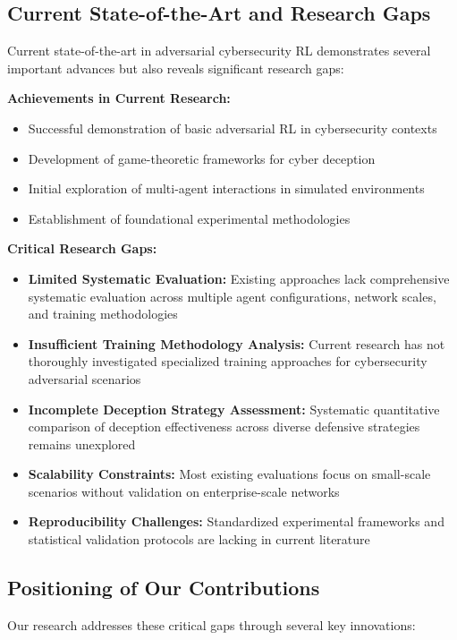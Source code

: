 \documentclass[12pt,oneside,a4paper]{article}
\theoremstyle{definition}
\theoremstyle{plain}
\begin{document}
\subsection{Current State-of-the-Art and Research Gaps}

Current state-of-the-art in adversarial cybersecurity RL demonstrates several important advances but also reveals significant research gaps:

\textbf{Achievements in Current Research:}
\begin{itemize}
\item Successful demonstration of basic adversarial RL in cybersecurity contexts
\item Development of game-theoretic frameworks for cyber deception
\item Initial exploration of multi-agent interactions in simulated environments
\item Establishment of foundational experimental methodologies
\end{itemize}

\textbf{Critical Research Gaps:}
\begin{itemize}
\item \textbf{Limited Systematic Evaluation:} Existing approaches lack comprehensive systematic evaluation across multiple agent configurations, network scales, and training methodologies
\item \textbf{Insufficient Training Methodology Analysis:} Current research has not thoroughly investigated specialized training approaches for cybersecurity adversarial scenarios
\item \textbf{Incomplete Deception Strategy Assessment:} Systematic quantitative comparison of deception effectiveness across diverse defensive strategies remains unexplored
\item \textbf{Scalability Constraints:} Most existing evaluations focus on small-scale scenarios without validation on enterprise-scale networks
\item \textbf{Reproducibility Challenges:} Standardized experimental frameworks and statistical validation protocols are lacking in current literature
\end{itemize}

\subsection{Positioning of Our Contributions}

Our research addresses these critical gaps through several key innovations:
\end{document}
